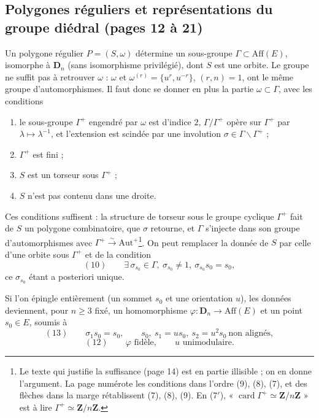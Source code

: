 \documentclass[11pt,a4paper]{article}
\begin{document}
\subsection*{Polygones réguliers et représentations du groupe diédral (pages 12 à 21)}

Un polygone régulier $P = (S, \omega)$ détermine un sous-groupe $\Gamma
\subset \mathrm{Aff}(E)$, isomorphe à $\mathbf{D}_n$ (sans isomorphisme
privilégié), dont $S$ est une orbite. Le groupe ne suffit pas à retrouver
$\omega$ : $\omega$ et $\omega^{(r)} = \{u^r, u^{-r}\}$, $(r, n) = 1$, ont le
même groupe d'automorphismes. Il faut donc se donner en plus la partie
$\omega \subset \Gamma$, avec les conditions
\begin{enumerate}
  \item[(6)] le sous-groupe $\Gamma^{+}$ engendré par $\omega$ est d'indice
    $2$, $\Gamma/\Gamma^{+}$ opère sur $\Gamma^{+}$ par $\lambda \mapsto
    \lambda^{-1}$, et l'extension est scindée par une involution $\sigma \in
    \Gamma \smallsetminus \Gamma^{+}$ ;
  \item[(7)] $\Gamma^{+}$ est fini ;
  \item[(8)] $S$ est un torseur sous $\Gamma^{+}$ ;
  \item[(9)] $S$ n'est pas contenu dans une droite.
\end{enumerate}
Ces conditions suffisent : la structure de torseur sous le groupe cyclique
$\Gamma^{+}$ fait de $S$ un polygone combinatoire, que $\sigma$ retourne, et
$\Gamma$ s'injecte dans son groupe d'automorphismes avec $\Gamma^{+}
\xrightarrow{\sim} \mathrm{Aut}^{+}$\footnote{Le texte qui justifie la
suffisance (page 14) est en partie illisible ; on en donne l'argument. La page
numérote les conditions dans l'ordre (9), (8), (7), et des flèches dans la
marge rétablissent (7), (8), (9). En (7$'$), « $\operatorname{card}
\Gamma^{+} \simeq \mathbf{Z}/n\mathbf{Z}$ » est à lire $\Gamma^{+} \simeq
\mathbf{Z}/n\mathbf{Z}$.}. On peut remplacer la donnée de $S$ par celle d'une
orbite sous $\Gamma^{+}$ et de la condition
\[
  (10) \qquad \exists\, \sigma_{s_0} \in \Gamma,\ \sigma_{s_0} \neq 1,\
  \sigma_{s_0} s_0 = s_0 ,
\]
ce $\sigma_{s_0}$ étant a posteriori unique.

Si l'on épingle entièrement (un sommet $s_0$ et une orientation $u$), les
données deviennent, pour $n \geq 3$ fixé, un homomorphisme $\varphi :
\mathbf{D}_n \to \mathrm{Aff}(E)$ et un point $s_0 \in E$, soumis à
\[
  (13) \qquad \sigma_1 s_0 = s_0, \qquad s_0,\ s_1 = u s_0,\ s_2 = u^2 s_0
  \ \text{non alignés},
\]
\[
  (12) \qquad \varphi \text{ fidèle}, \qquad u \text{ unimodulaire}.
\]
\end{document}
